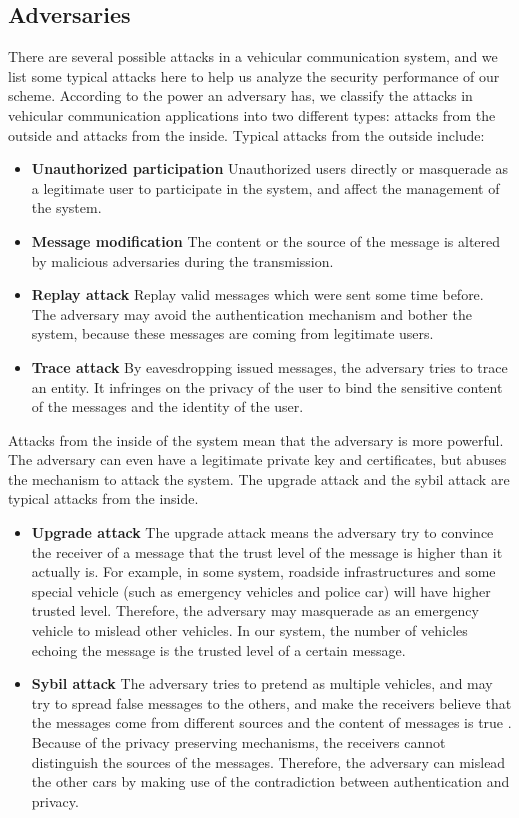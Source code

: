\documentclass[a4paper]{article}
\begin{document}
\subsection{Adversaries}
There are several possible attacks in a vehicular communication system, and we list some typical attacks here to help us analyze the security performance of our scheme. According to the power an adversary has, we classify the attacks in vehicular communication applications into two different types: attacks from the outside and attacks from the inside. Typical attacks from the outside include:
\begin{itemize}
  \item \textbf{Unauthorized participation} Unauthorized users directly or masquerade as a legitimate user to participate in the system, and affect the management of the system.
  \item \textbf{Message modification} The content or the source of the message is altered by malicious adversaries during the transmission.
  \item \textbf{Replay attack} Replay valid messages which were sent some time before. The adversary may avoid the authentication mechanism and bother the system, because these messages are coming from legitimate users.
  \item \textbf{Trace attack} By eavesdropping issued messages, the adversary tries to trace an entity. It infringes on the privacy of the user to bind the sensitive content of the messages and the identity of the user.
\end{itemize}

Attacks from the inside of the system mean that the adversary is more powerful. The adversary can even have a legitimate private key and certificates, but abuses the mechanism to attack the system. The upgrade attack and the sybil attack are typical attacks from the inside.
\begin{itemize}
  \item \textbf{Upgrade attack} The upgrade attack means the adversary try to convince the receiver of a message that the trust level of the message is higher than it actually is. For example, in some system, roadside infrastructures and some special vehicle (such as emergency vehicles and police car) will have higher trusted level. Therefore, the adversary may masquerade as an emergency vehicle to mislead other vehicles. In our system, the number of vehicles echoing the message is the trusted level of a certain message.
  \item \textbf{Sybil attack} The adversary tries to pretend as multiple vehicles, and may try to spread false messages to the others, and make the receivers believe that the messages come from different sources and the content of messages is true \cite{Dou02}. Because of the privacy preserving mechanisms, the receivers cannot distinguish the sources of the messages. Therefore, the adversary can mislead the other cars by making use of the contradiction between authentication and privacy.
\end{itemize}
\end{document}
